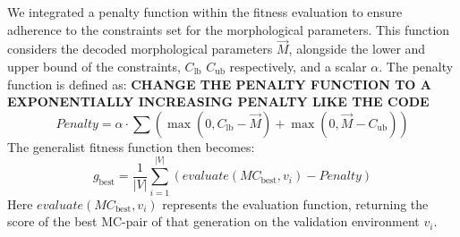     We integrated a penalty function within the fitness evaluation to ensure adherence to the constraints set for the morphological parameters. This function considers the decoded morphological parameters $\overrightarrow{M}$, alongside the lower and upper bound of the constraints, $C_\text{lb}$ $C_\text{ub}$ respectively, and a scalar $\alpha$. The penalty function is defined as:
    \textbf{CHANGE THE PENALTY FUNCTION TO A EXPONENTIALLY INCREASING PENALTY LIKE THE CODE}
    \begin{equation}
        Penalty = \alpha \cdot \sum(
            \max(0, C_\text{lb} - \overrightarrow{M}) + 
            \max(0, \overrightarrow{M} - C_\text{ub})
        )
    \end{equation}
    The generalist fitness function then becomes:
    \begin{equation}
        g_{\text{best}} = \frac{1}{|V|} \sum_{i=1}^{|V|}(
            evaluate(MC_{\text{best}}, v_i) - Penalty
        ) 
    \end{equation}
    Here $evaluate(MC_{\text{best}}, v_i)$ represents the evaluation function, returning the score of the best MC-pair of that generation on the validation environment $v_i$.